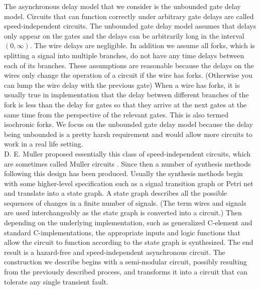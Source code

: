 \documentclass[12pt]{report}
\begin{document}
The asynchronous delay model that we consider is the unbounded gate delay model.  Circuits that can function correctly under arbitrary gate delays are called speed-independent circuits. The unbounded gate delay model assumes that delays only appear on the gates and the delays can be arbitrarily long in the interval $(0,\infty)$.  The wire delays are negligible.  In addition we assume all forks, which is splitting a signal into multiple branches, do not have any time delays between each of its branches.  These assumptions are reasonable because the delays on the wires only change the operation of a circuit if the wire has forks.  (Otherwise you can lump the wire delay with the previous gate)  When a wire has forks, it is usually true in implementation that the delay between different branches of the fork is less than the delay for gates so that they arrive at the next gates at the same time from the perspective of the relevant gates.  This is also termed isochronic forks.  We focus on the unbounded gate delay model because the delay being unbounded is a pretty harsh requirement and would allow more circuits to work in a real life setting. \\ %

D. E. Muller proposed essentially this class of speed-independent circuits, which are sometimes called Muller circuits \cite{Muller_59}.  Since then a number of synthesis methods following this design has been produced.  Usually the synthesis methods begin with some higher-level specification such as a signal transition graph or Petri net and translate into a state graph.  A state graph describes all the possible sequences of changes in a finite number of signals.  (The term wires and signals are used interchangeably as the state graph is converted into a circuit.)  Then depending on the underlying implementation, such as generalized C-element and standard C-implementations, the appropriate inputs and logic functions that allow the circuit to function according to the state graph is synthesized.  The end result is a hazard-free and speed-independent asynchronous circuit.  The construction we describe begins with a semi-modular circuit, possibly resulting from the previously described process, and transforms it into a circuit that can tolerate any single transient fault.
     
\end{document}
